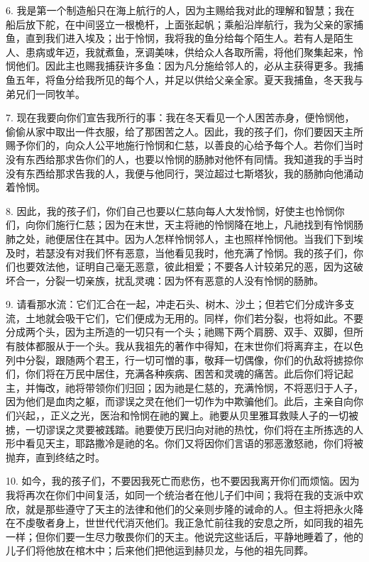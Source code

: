 6. 我是第一个制造船只在海上航行的人，因为主赐给我对此的理解和智慧；我在船后放下舵，在中间竖立一根桅杆，上面张起帆；乘船沿岸航行，我为父亲的家捕鱼，直到我们进入埃及；出于怜悯，我将我的鱼分给每个陌生人。若有人是陌生人、患病或年迈，我就煮鱼，烹调美味，供给众人各取所需，将他们聚集起来，怜悯他们。因此主也赐我捕获许多鱼：因为凡分施给邻人的，必从主获得更多。我捕鱼五年，将鱼分给我所见的每个人，并足以供给父亲全家。夏天我捕鱼，冬天我与弟兄们一同牧羊。\par

7. 现在我要向你们宣告我所行的事：我在冬天看见一个人困苦赤身，便怜悯他，偷偷从家中取出一件衣服，给了那困苦之人。因此，我的孩子们，你们要因天主所赐予你们的，向众人公平地施行怜悯和仁慈，以善良的心给予每个人。若你们当时没有东西给那求告你们的人，也要以怜悯的肠肺对他怀有同情。我知道我的手当时没有东西给那求告我的人，我便与他同行，哭泣超过七斯塔狄，我的肠肺向他涌动着怜悯。\par

8. 因此，我的孩子们，你们自己也要以仁慈向每人大发怜悯，好使主也怜悯你们，向你们施行仁慈；因为在末世，天主将祂的怜悯降在地上，凡祂找到有怜悯肠肺之处，祂便居住在其中。因为人怎样怜悯邻人，主也照样怜悯他。当我们下到埃及时，若瑟没有对我们怀有恶意，当他看见我时，他充满了怜悯。我的孩子们，你们也要效法他，证明自己毫无恶意，彼此相爱；不要各人计较弟兄的恶，因为这破坏合一，分裂一切亲族，扰乱灵魂：因为怀有恶意的人没有怜悯的肠肺。\par

9. 请看那水流：它们汇合在一起，冲走石头、树木、沙土；但若它们分成许多支流，土地就会吸干它们，它们便成为无用的。同样，你们若分裂，也将如此。不要分成两个头，因为主所造的一切只有一个头；祂赐下两个肩膀、双手、双脚，但所有肢体都服从于一个头。我从我祖先的著作中得知，在末世你们将离弃主，在以色列中分裂，跟随两个君王，行一切可憎的事，敬拜一切偶像，你们的仇敌将掳掠你们，你们将在万民中居住，充满各种疾病、困苦和灵魂的痛苦。此后你们将记起主，并悔改，祂将带领你们归回；因为祂是仁慈的，充满怜悯，不将恶归于人子，因为他们是血肉之躯，而谬误之灵在他们一切作为中欺骗他们。此后，主亲自向你们兴起，，正义之光，医治和怜悯在祂的翼上。祂要从贝里雅耳救赎人子的一切被掳，一切谬误之灵要被践踏。祂要使万民归向对祂的热忱，你们将在主所拣选的人形中看见天主，耶路撒冷是祂的名。你们又将因你们言语的邪恶激怒祂，你们将被抛弃，直到终结之时。\par

10. 如今，我的孩子们，不要因我死亡而悲伤，也不要因我离开你们而烦恼。因为我将再次在你们中间复活，如同一个统治者在他儿子们中间；我将在我的支派中欢欣，就是那些遵守了天主的法律和他们的父亲则步隆的诫命的人。但主将把永火降在不虔敬者身上，世世代代消灭他们。我正急忙前往我的安息之所，如同我的祖先一样；但你们要一生尽力敬畏你们的天主。他说完这些话后，平静地睡着了，他的儿子们将他放在棺木中；后来他们把他运到赫贝龙，与他的祖先同葬。\par

